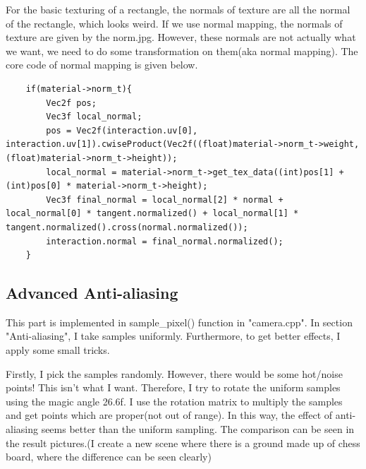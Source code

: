\documentclass[acmtog]{acmart}
\begin{document}
For the basic texturing of a rectangle, the normals of texture are all the normal of the rectangle, 
which looks weird. If we use normal mapping, the normals of texture are given by the norm.jpg. 
However, these normals are not actually what we want, we need to do some transformation on them(aka normal mapping). 
The core code of normal mapping is given below.
\begin{lstlisting}	
	if(material->norm_t){
		Vec2f pos;
		Vec3f local_normal;
		pos = Vec2f(interaction.uv[0], interaction.uv[1]).cwiseProduct(Vec2f((float)material->norm_t->weight, (float)material->norm_t->height));
		local_normal = material->norm_t->get_tex_data((int)pos[1] + (int)pos[0] * material->norm_t->height);
		Vec3f final_normal = local_normal[2] * normal + local_normal[0] * tangent.normalized() + local_normal[1] * tangent.normalized().cross(normal.normalized());
		interaction.normal = final_normal.normalized();
    }
\end{lstlisting}

\subsection{Advanced Anti-aliasing}
\quad This part is implemented in sample\_pixel() function in "camera.cpp".
In section "Anti-aliasing", I take samples uniformly.
Furthermore, to get better effects, I apply some small tricks.


Firstly, I pick the samples randomly. However, there would be some hot/noise points! This isn't what I want. 
Therefore, I try to rotate the uniform samples using the magic angle 26.6f. 
I use the rotation matrix to multiply the samples and get points which are proper(not out of range). 
In this way, the effect of anti-aliasing seems better than the uniform sampling. 
The comparison can be seen in the result pictures.(I create a new scene where there is a ground made up of chess board, where the difference can be seen clearly)
\end{document}
